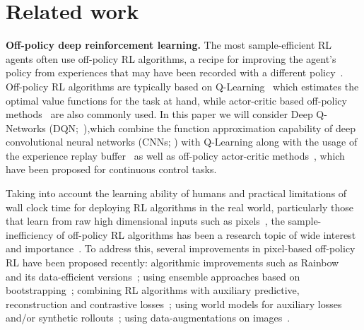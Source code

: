 \documentclass{article}
\begin{document}
\section{Related work} \label{sec:ref}

{\bf Off-policy deep reinforcement learning.} The most sample-efficient RL agents often use off-policy RL algorithms, a recipe for improving the agent's policy from experiences that may have been recorded with a different policy~\citep{sutton2018reinforcement}. Off-policy RL algorithms are typically based on Q-Learning~\citep{watkins1992q} which estimates the optimal value functions for the task at hand, while actor-critic based off-policy methods~\citep{lillicrap2015continuous, schulman2017equivalence, haarnoja2018soft} are also commonly used. 
In this paper we will consider Deep Q-Networks (DQN;~\citealt{mnih2015human}),which combine the function approximation capability of deep convolutional neural networks (CNNs; \citealt{lecun1998gradient}) with Q-Learning along with the usage of the experience replay buffer~\citep{lin1992self} as well as off-policy actor-critic methods~\citep{lillicrap2015continuous,haarnoja2018soft}, which have been proposed for continuous control tasks.

Taking into account the learning ability of humans and practical limitations of wall clock time for deploying RL algorithms in the real world, particularly those that learn from raw high dimensional inputs such as pixels~\citep{kalashnikov2018qt}, the sample-inefficiency of off-policy RL algorithms has been a research topic of wide interest and importance~\citep{lake2017building, kaiser2019model}. To address this, several improvements in pixel-based off-policy RL have been proposed recently: algorithmic improvements such as Rainbow~\citep{hessel2018rainbow} and its data-efficient versions~\citep{van2019use}; using ensemble approaches based on bootstrapping~\citep{osband2016deep, lee2020sunrise}; combining RL algorithms with auxiliary predictive, reconstruction and contrastive losses~\citep{jaderberg2016reinforcement, higgins2017darla, oord2018representation, yarats2019improving, srinivas2020curl, stooke2020decoupling}; using world models for auxiliary losses and/or synthetic rollouts~\citep{sutton1991dyna, ha2018world, kaiser2019model, hafner2019dream}; using data-augmentations on images~\citep{laskin2020reinforcement, kostrikov2020image}.
\end{document}
